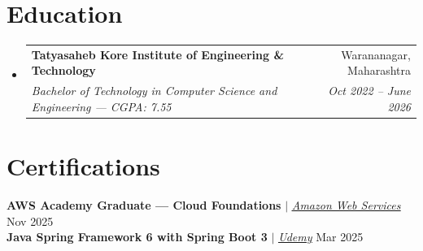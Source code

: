 \documentclass[letterpaper,11pt]{article}
\makeatletter
\newcommand{\resumeSubheading}[4]{
  \vspace{-2pt}\item
    \begin{tabular*}{0.97\textwidth}[t]{l@{\extracolsep{\fill}}r}
      \textbf{#1} & #2 \\
      \textit{\small#3} & \textit{\small #4} \\
    \end{tabular*}\vspace{-7pt}
}
\newcommand{\resumeSubHeadingListStart}{\begin{itemize}[leftmargin=0.15in, label={}]}
\newcommand{\resumeSubHeadingListEnd}{\end{itemize}}
\makeatother
\begin{document}
\section{Education}
  \resumeSubHeadingListStart
    \resumeSubheading
      {Tatyasaheb Kore Institute of Engineering \& Technology}{Warananagar, Maharashtra}
      {Bachelor of Technology in Computer Science and Engineering --- CGPA: 7.55}{Oct 2022 -- June 2026}
  \resumeSubHeadingListEnd
\section{Certifications}
  \begin{itemize}[leftmargin=0.15in, label={}]
    \small{\item{
      \textbf{AWS Academy Graduate --- Cloud Foundations} $|$ \href{https://www.credly.com/badges/6537fbfe-992b-4708-b442-c3e197cf2af0/public_url}{\underline{\emph{Amazon Web Services}}} \hfill Nov 2025 \\
      \textbf{Java Spring Framework 6 with Spring Boot 3} $|$ \href{https://www.udemy.com/certificate/UC-d846a318-218c-4b7d-8bee-7e0fbcb08073/}{\underline{\emph{Udemy}}} \hfill Mar 2025
    }}
  \end{itemize}
\end{document}

